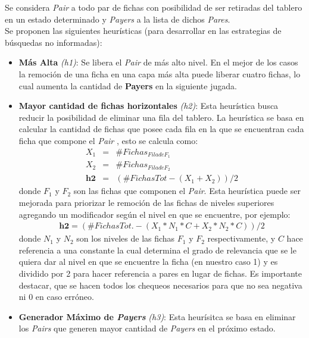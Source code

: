 \documentclass{sig-alternate}
\begin{document}
	Se considera \textit{Pair} a todo par de fichas con posibilidad de ser retiradas del tablero en un estado determinado y \textit{Payers} a la lista de dichos \textit{Pares}. \\
	Se proponen las siguientes heur\'isticas (para desarrollar en las estrategias de b\'usquedas no informadas):
	\begin{itemize}

		\item \textbf{M\'as Alta} \textit{(h1)}: Se libera el \textit{Pair} de m\'as alto nivel. En el mejor de los casos la remoci\'on de una ficha en una capa m\'as alta puede liberar cuatro fichas, lo cual aumenta la cantidad de \textbf{Payers} en la siguiente jugada.
		
		\item \textbf{Mayor cantidad de fichas horizontales} \textit{(h2)}: Esta heur\'istica busca reducir la posibilidad de eliminar una fila del tablero. La heur\'istica se basa en calcular la cantidad de fichas que posee cada fila en la que se encuentran cada ficha que compone el \textit{Pair} , esto se calcula como:
			\begin{eqnarray}
				X_{1}  & = & \# Fichas_{Fila de F_{1}} \\
				X_{2}  & = & \# Fichas_{Fila de F_{2}} \\
				\textbf{h2} & = & (\#FichasTot - ( X_{1} + X_{2} )) / 2
			\end{eqnarray}
		donde $F_{1}$ y $F_{2}$ son las fichas que componen el \textit{Pair}. Esta heur\'istica puede ser mejorada para priorizar le remoci\'on de las fichas de niveles superiores agregando un modificador seg\'un el nivel en que se encuentre, por ejemplo:
			\begin{eqnarray}
				\textbf{h2}  = (\#FichasTot. - ( X_{1} * N_{1} * C + X_{2} * N_{2} * C) )/ 2
			\end{eqnarray}
				donde $N_{1}$ y $N_{2}$ son los niveles de las fichas $F_{1}$ y $F_{2}$ respectivamente, y $C$ hace referencia a una constante la cual determina el grado de relevancia que se le quiera dar al nivel en que se encuentre la ficha (en nuestro caso 1) y es dividido por 2 para hacer referencia a pares en lugar de fichas. Es importante destacar, que se hacen todos los chequeos necesarios para que no sea negativa ni $0$ en caso err\'oneo.
		
		\item \textbf{Generador M\'aximo de \textit{Payers}} \textit{(h3)}: Esta heur\'isitca se basa en eliminar los \textit{Pairs} que generen mayor cantidad de \textit{Payers} en el pr\'oximo estado.
		
	\end{itemize}
	
\end{document}

